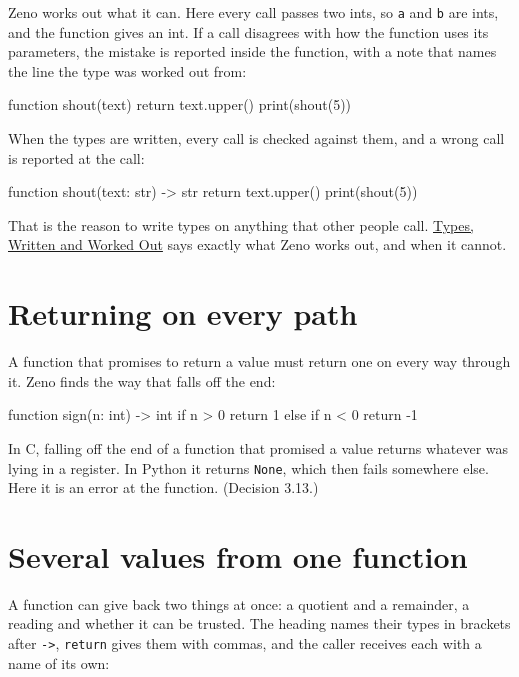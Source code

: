 Zeno works out what it can. Here every call passes two ints, so
\verb|a| and \verb|b| are ints, and the function gives an int. If a
call disagrees with how the function uses its parameters, the mistake
is reported inside the function, with a note that names the line the
type was worked out from:

\begin{zeno}[fails=yes]
function shout(text) {
    return text.upper()
}
print(shout(5))
\end{zeno}

When the types are written, every call is checked against them, and a
wrong call is reported at the call:

\begin{zeno}[fails=yes]
function shout(text: str) -> str {
    return text.upper()
}
print(shout(5))
\end{zeno}

That is the reason to write types on anything that other people call.
\hyperref[ch-types]{Types, Written and Worked Out} says exactly what
Zeno works out, and when it cannot.

\section{Returning on every path}

A function that promises to return a value must return one on every
way through it. Zeno finds the way that falls off the end:

\begin{zeno}[fails=yes]
function sign(n: int) -> int {
    if n > 0 {
        return 1
    } else if n < 0 {
        return -1
    }
}
\end{zeno}

\begin{why}
In C, falling off the end of a function that promised a value returns
whatever was lying in a register. In Python it returns \verb|None|,
which then fails somewhere else. Here it is an error at the function.
(Decision 3.13.)
\end{why}

\section{Several values from one function}

A function can give back two things at once: a quotient and a
remainder, a reading and whether it can be trusted. The heading names
their types in brackets after \verb|->|, \verb|return| gives them with
commas, and the caller receives each with a name of its own:

